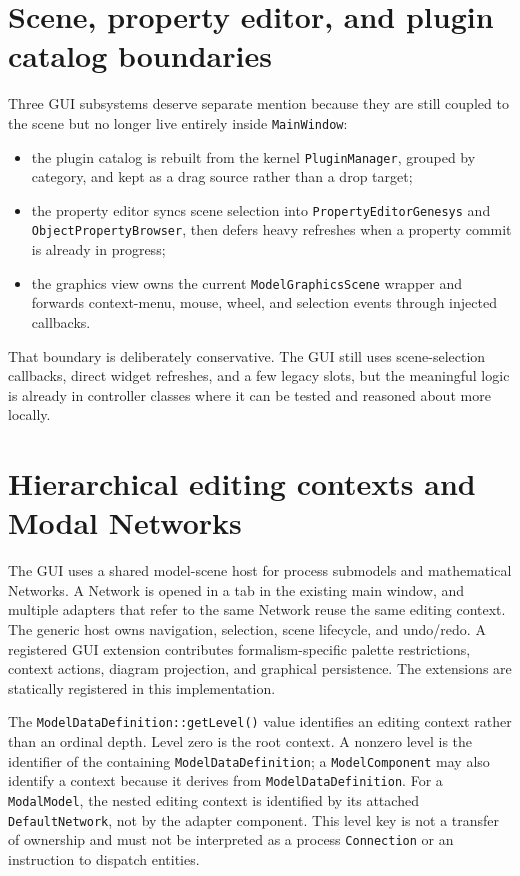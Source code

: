 \section{Scene, property editor, and plugin catalog boundaries}
\label{sec:gui-architecture-boundaries}

Three GUI subsystems deserve separate mention because they are still coupled to the scene but no longer live entirely inside \texttt{MainWindow}:
\begin{itemize}
\item the plugin catalog is rebuilt from the kernel \texttt{PluginManager}, grouped by category, and kept as a drag source rather than a drop target;
\item the property editor syncs scene selection into \texttt{PropertyEditorGenesys} and \texttt{ObjectPropertyBrowser}, then defers heavy refreshes when a property commit is already in progress;
\item the graphics view owns the current \texttt{ModelGraphicsScene} wrapper and forwards context-menu, mouse, wheel, and selection events through injected callbacks.
\end{itemize}

That boundary is deliberately conservative. The GUI still uses scene-selection callbacks, direct widget refreshes, and a few legacy slots, but the meaningful logic is already in controller classes where it can be tested and reasoned about more locally.

\section{Hierarchical editing contexts and Modal Networks}
\label{sec:gui-hierarchical-editing-contexts}

The GUI uses a shared model-scene host for process submodels and mathematical
Networks. A Network is opened in a tab in the existing main window, and multiple
adapters that refer to the same Network reuse the same editing context. The
generic host owns navigation, selection, scene lifecycle, and undo/redo. A
registered GUI extension contributes formalism-specific palette restrictions,
context actions, diagram projection, and graphical persistence. The extensions
are statically registered in this implementation.

The \texttt{ModelDataDefinition::getLevel()} value identifies an editing
context rather than an ordinal depth. Level zero is the root context.
A nonzero level is the identifier of the containing
\texttt{ModelDataDefinition}; a \texttt{ModelComponent} may also identify a
context because it derives from \texttt{ModelDataDefinition}.
For a \texttt{ModalModel}, the nested editing context is identified
by its attached \texttt{DefaultNetwork}, not by the adapter component.
This level key is not a transfer of ownership and must not be interpreted
as a process \texttt{Connection} or an instruction to dispatch entities.

